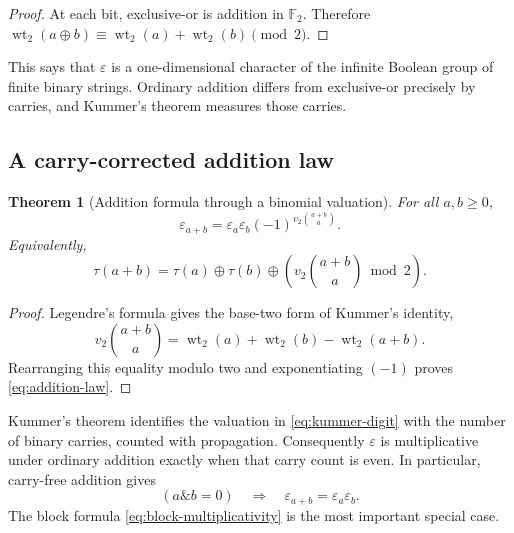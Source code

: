 \documentclass[11pt,oneside]{article}
\newtheorem{theorem}{Theorem}[section]
\theoremstyle{definition}
\theoremstyle{remark}
\newcommand{\Ftwo}{\mathbb F_2}
\newcommand{\wt}{\operatorname{wt}_2}
\newcommand{\vtwo}{v_2}
\newcommand{\xor}{\mathbin{\oplus}}
\begin{document}
\begin{proof}
At each bit, exclusive-or is addition in \(\Ftwo\).  Therefore
\(\wt(a\xor b)\equiv\wt(a)+\wt(b)\pmod2\).
\end{proof}

This says that \(\varepsilon\) is a one-dimensional character of the infinite
Boolean group of finite binary strings.  Ordinary addition differs from
exclusive-or precisely by carries, and Kummer's theorem measures those
carries.

\subsection{A carry-corrected addition law}

\begin{theorem}[Addition formula through a binomial valuation]
\label{thm:addition-law}
For all \(a,b\ge0\),
\begin{equation}
 \boxed{\quad
 \varepsilon_{a+b}=\varepsilon_a\varepsilon_b
          (-1)^{\vtwo\binom{a+b}{a}}.
 \quad}
 \label{eq:addition-law}
\end{equation}
Equivalently,
\begin{equation}
 \tau(a+b)=\tau(a)\xor\tau(b)\xor
       \left(\vtwo\binom{a+b}{a}\bmod2\right).
 \label{eq:addition-law-bit}
\end{equation}
\end{theorem}

\begin{proof}
Legendre's formula gives the base-two form of Kummer's identity,
\begin{equation}
 \vtwo\binom{a+b}{a}
 =\wt(a)+\wt(b)-\wt(a+b).
 \label{eq:kummer-digit}
\end{equation}
Rearranging this equality modulo two and exponentiating \((-1)\) proves
\eqref{eq:addition-law}.
\end{proof}

Kummer's theorem identifies the valuation in \eqref{eq:kummer-digit} with the
number of binary carries, counted with propagation.  Consequently
\(\varepsilon\) is multiplicative under ordinary addition exactly when that
carry count is even.  In particular, carry-free addition gives
\begin{equation}
 (a\mathbin{\&}b=0)
 \quad\Longrightarrow\quad
 \varepsilon_{a+b}=\varepsilon_a\varepsilon_b.
 \label{eq:carry-free}
\end{equation}
The block formula \eqref{eq:block-multiplicativity} is the most important
special case.
\end{document}
